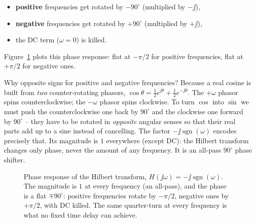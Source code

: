 \begin{itemize}
  \item \textbf{positive} frequencies get rotated by $-90^\circ$ (multiplied by $-\jj$),
  \item \textbf{negative} frequencies get rotated by $+90^\circ$ (multiplied by $+\jj$),
  \item the DC term ($\omega=0$) is killed.
\end{itemize}

Figure~\ref{ch25:fig-phase} plots this phase response: flat at $-\pi/2$ for positive
frequencies, flat at $+\pi/2$ for negative ones.

\begin{whybox}
Why opposite signs for positive and negative frequencies? Because a real cosine is built
from \emph{two} counter-rotating phasors,
$\cos\theta = \tfrac12 e^{\jj\theta} + \tfrac12 e^{-\jj\theta}$. The $+\omega$ phasor
spins counterclockwise; the $-\omega$ phasor spins clockwise. To turn $\cos$ into $\sin$
we must push the counterclockwise one back by $90^\circ$ and the clockwise one forward by
$90^\circ$ -- they have to be rotated in \emph{opposite} angular senses so that their real
parts add up to a sine instead of cancelling. The factor $-\jj\operatorname{sgn}(\omega)$
encodes precisely that. Its magnitude is $1$ everywhere (except DC): the Hilbert
transform changes only phase, never the amount of any frequency. It is an all-pass
$90^\circ$ phase shifter.
\end{whybox}

\begin{figure}[H]
\centering
{}
\caption{Phase response of the Hilbert transform, $H(\jj\omega)=-\jj\operatorname{sgn}(\omega)$.
The magnitude is $1$ at every frequency (an all-pass), and the phase is a flat
$\mp90^\circ$: positive frequencies rotate by $-\pi/2$, negative ones by $+\pi/2$, with
DC killed. The same quarter-turn at every frequency is what no fixed time delay can
achieve.}
\label{ch25:fig-phase}
\end{figure}

